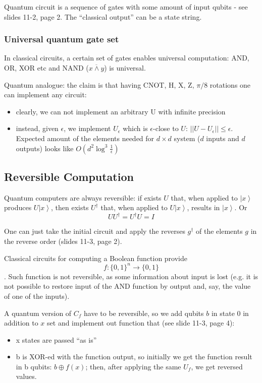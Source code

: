 \documentclass{scrartcl}
\newcommand{\ket}[1]{\left| #1 \right>} %
\begin{document}
Quantum circuit is a sequence of gates with some amount of input qubits - see
slides 11-2, page 2. The ``classical output'' can be a state string.

\subsubsection{Universal quantum gate set}

In classical circuits, a certain set of gates enables universal computation:
AND, OR, XOR etc and NAND ($\overline{x \wedge y}$) is universal.

Quantum analogue: the claim is that having CNOT, H, X, Z, $\pi/8$ rotations one
can implement any circuit:
\begin{itemize}
\item clearly, we can not implement an arbitrary U with infinite precision
\item instead, given $\epsilon$, we implement $U_{\epsilon}$ which is
  $\epsilon$-close to $U$: $||U-U_{\epsilon}|| \leq \epsilon$. Expected amount
  of the elements needed for $d \times d$ system ($d$ inputs and $d$ outputs)
  looks like $O(d^2 \log^3 \frac1{\epsilon})$
\end{itemize}

\subsection{Reversible Computation}

Quantum computers are always reversible: if exists $U$ that, when applied to
$\ket x$ produces $U \ket x$, then exists $U^\dag$ that, when applied to $U \ket
x$, results in $\ket x$. Or $$U U^\dag = U^\dag U = I$$

One can just take the initial circuit and apply the reverses $g^\dag$ of the
elements $g$ in the reverse order (slides 11-3, page 2).

Classical circuits for computing a Boolean function provide $$f: \{0, 1\}^n
\rightarrow \{0, 1\}$$. Such function is not reversible, as some information
about input is lost (e.g. it is not possible to restore input of the AND
function by output and, say, the value of one of the inputs).
 
A quantum version of $C_f$ have to be reversible, so we add qubits $b$ in state
0 in addition to $x$ set and implement out function that (see slide 11-3, page
4):
\begin{itemize}
\item x states are passed ``as is''
\item b is XOR-ed with the function output, so initially we get the function
  result in b qubits: $b \oplus f(x)$; then, after applying the same $U_f$, we
  get reversed values.
\end{itemize}
\end{document}
